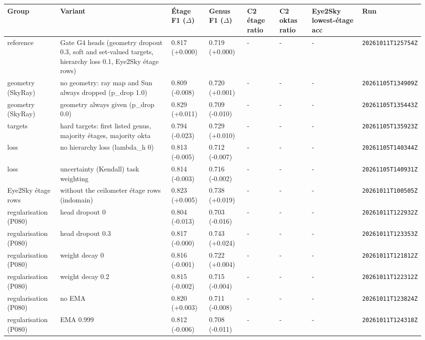 \begin{center}{\scriptsize\setlength{\tabcolsep}{3pt}
\begin{tabular}{lp{3.0cm}llllll}
\toprule
Group & Variant & Étage F1 ($\Delta$) & Genus F1 ($\Delta$) & C2 étage ratio & C2 oktas ratio & Eye2Sky lowest-étage acc & Run \\
\midrule
reference & Gate G4 heads (geometry dropout 0.3, soft and set-valued targets, hierarchy loss 0.1, Eye2Sky étage rows) & 0.817 (+0.000) & 0.719 (+0.000) & - & - & - & \texttt{20261011T125754Z} \\
geometry (SkyRay) & no geometry: ray map and Sun always dropped (p\_drop 1.0) & 0.809 (-0.008) & 0.720 (+0.001) & - & - & - & \texttt{20261105T134909Z} \\
geometry (SkyRay) & geometry always given (p\_drop 0.0) & 0.829 (+0.011) & 0.709 (-0.010) & - & - & - & \texttt{20261105T135443Z} \\
targets & hard targets: first listed genus, majority étages, majority okta & 0.794 (-0.023) & 0.729 (+0.010) & - & - & - & \texttt{20261105T135923Z} \\
loss & no hierarchy loss (lambda\_h 0) & 0.813 (-0.005) & 0.712 (-0.007) & - & - & - & \texttt{20261105T140344Z} \\
loss & uncertainty (Kendall) task weighting & 0.814 (-0.003) & 0.716 (-0.002) & - & - & - & \texttt{20261105T140931Z} \\
Eye2Sky étage rows & without the ceilometer étage rows (indomain) & 0.823 (+0.005) & 0.738 (+0.019) & - & - & - & \texttt{20261011T100505Z} \\
regularisation (P080) & head dropout 0 & 0.804 (-0.013) & 0.703 (-0.016) & - & - & - & \texttt{20261011T122932Z} \\
regularisation (P080) & head dropout 0.3 & 0.817 (-0.000) & 0.743 (+0.024) & - & - & - & \texttt{20261011T123353Z} \\
regularisation (P080) & weight decay 0 & 0.816 (-0.001) & 0.722 (+0.004) & - & - & - & \texttt{20261011T121812Z} \\
regularisation (P080) & weight decay 0.2 & 0.815 (-0.002) & 0.715 (-0.004) & - & - & - & \texttt{20261011T122312Z} \\
regularisation (P080) & no EMA & 0.820 (+0.003) & 0.711 (-0.008) & - & - & - & \texttt{20261011T123824Z} \\
regularisation (P080) & EMA 0.999 & 0.812 (-0.006) & 0.708 (-0.011) & - & - & - & \texttt{20261011T124318Z} \\
\bottomrule
\end{tabular}}
\end{center}

